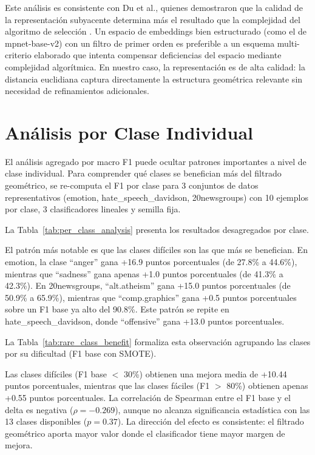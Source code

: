 Este análisis es consistente con Du et al., quienes demostraron que la calidad de la representación subyacente determina más el resultado que la complejidad del algoritmo de selección \cite{du2025disentangling}. Un espacio de embeddings bien estructurado (como el de mpnet-base-v2) con un filtro de primer orden es preferible a un esquema multi-criterio elaborado que intenta compensar deficiencias del espacio mediante complejidad algorítmica. En nuestro caso, la representación es de alta calidad: la distancia euclidiana captura directamente la estructura geométrica relevante sin necesidad de refinamientos adicionales.

\section{Análisis por Clase Individual}
\label{sec:analisis_per_class}

El análisis agregado por macro F1 puede ocultar patrones importantes a nivel de clase individual. Para comprender qué clases se benefician más del filtrado geométrico, se re-computa el F1 por clase para 3 conjuntos de datos representativos (emotion, hate\_speech\_davidson, 20newsgroups) con 10 ejemplos por clase, 3 clasificadores lineales y semilla fija.

La Tabla~\ref{tab:per_class_analysis} presenta los resultados desagregados por clase.



El patrón más notable es que las clases difíciles son las que más se benefician. En emotion, la clase ``anger'' gana +16.9 puntos porcentuales (de 27.8\% a 44.6\%), mientras que ``sadness'' gana apenas +1.0 puntos porcentuales (de 41.3\% a 42.3\%). En 20newsgroups, ``alt.atheism'' gana +15.0 puntos porcentuales (de 50.9\% a 65.9\%), mientras que ``comp.graphics'' gana +0.5 puntos porcentuales sobre un F1 base ya alto del 90.8\%. Este patrón se repite en hate\_speech\_davidson, donde ``offensive'' gana +13.0 puntos porcentuales.

La Tabla~\ref{tab:rare_class_benefit} formaliza esta observación agrupando las clases por su dificultad (F1 base con SMOTE).



Las clases difíciles (F1 base $<$ 30\%) obtienen una mejora media de +10.44 puntos porcentuales, mientras que las clases fáciles (F1 $>$ 80\%) obtienen apenas +0.55 puntos porcentuales. La correlación de Spearman entre el F1 base y el delta es negativa ($\rho = -0.269$), aunque no alcanza significancia estadística con las 13 clases disponibles ($p = 0.37$). La dirección del efecto es consistente: el filtrado geométrico aporta mayor valor donde el clasificador tiene mayor margen de mejora.

